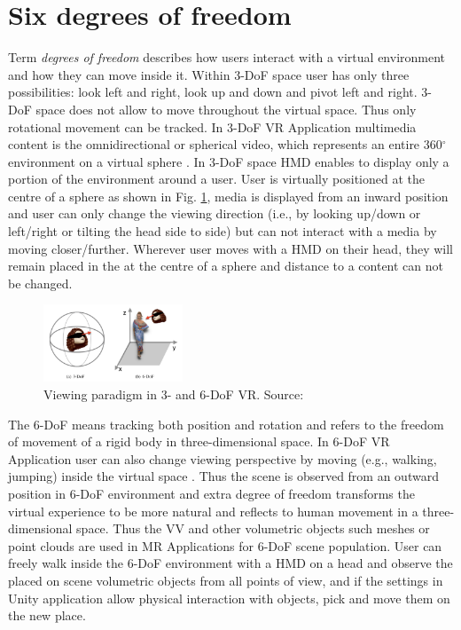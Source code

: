 \section{Six degrees of freedom}
\label{sec:theorie:6dof} 
Term \textit{degrees of freedom} describes how users interact with a virtual environment and how they can move inside it. Within 3-DoF space user has only three possibilities: look left and right, look up and down and pivot left and right. 3-DoF space does not allow to move throughout the virtual space. Thus only rotational movement can be tracked. In 3-DoF VR Application multimedia content is the omnidirectional or spherical video, which represents an entire 360$^{\circ}$ environment on a virtual sphere \cite{6-dof_metrics}. In 3-DoF space HMD enables to display only a portion of the environment around a user. User is virtually positioned at the centre of a sphere as shown in Fig. \ref{fig:3and6dof}, media is displayed from an inward position and user can only change the viewing direction (i.e., by looking up/down or left/right or tilting the head side to side) \cite{6-dof_metrics} but can not interact with a media by moving closer/further. Wherever user moves with a HMD on their head, they will remain placed in the at the centre of a sphere and distance to a content can not be changed.
\begin{figure}
	\centering
	\includegraphics[width=0.37\textwidth]{gfx/3-6dof.png}
	\caption{\label{fig:3and6dof}Viewing paradigm in 3- and 6-DoF VR. Source: \cite{6-dof_metrics}}
\end{figure}

The 6-DoF means tracking both position and rotation and refers to the freedom of movement of a rigid body in three-dimensional space. In 6-DoF VR Application user can also change viewing perspective by moving (e.g., walking, jumping) inside the virtual space \cite{6-dof_metrics}. Thus the scene is observed from an outward position in 6-DoF environment and extra degree of freedom transforms the virtual experience to be more natural and reflects to human movement in a three-dimensional space. Thus the VV and other volumetric objects such meshes or point clouds are used in MR Applications for 6-DoF scene population. User can freely walk inside the 6-DoF environment with a HMD on a head and observe the placed on scene volumetric objects from all points of view, and if the settings in Unity application allow physical interaction with objects, pick and move them on the new place. 

